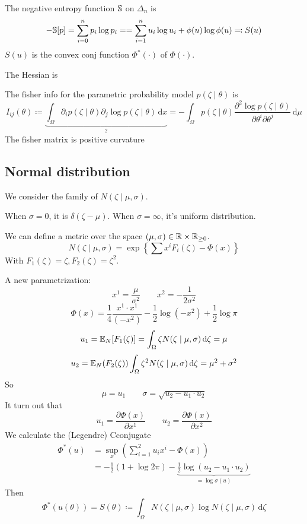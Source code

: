 \documentclass{amsart}
\let\originalmathbb\mathbb
\renewcommand{\mathbb}[1]{%
    \ifstrequal{#1}{1}{\mathbbm{#1}}{\originalmathbb{#1}}%
}
\theoremstyle{plain}
\theoremstyle{definition}
\theoremstyle{remark}
\begin{document}
The negative entropy function $\mathbb{S}$ on $\Delta _n$ is
\[
-\mathbb{S}[p]=\sum_{i=0}^{n} p_i\log p_i==\sum_{i=1}^{n} u_i\log u_i+\phi (u)\log \phi(u)\eqqcolon S(u)
\]
$S (u)$ is the convex conj function $\Phi^{*}(\cdot)$ of $\Phi(\cdot )$.

The Hessian is

The fisher info for the parametric probability model $p(\zeta \mid\theta)$  is
\[
I_{ij}(\theta)\coloneqq \underbrace{ \int_{\Omega}^{} \partial _ip(\zeta \mid \theta)\partial _j\log p(\zeta \mid \theta) \, \mathrm{d}x  }_{ ? }= -\int_{\Omega}^{} p(\zeta \mid \theta)\frac{ \partial^2 \log p(\zeta \mid \theta) }{ \partial \theta^{i}\partial \theta^{j} }  \, \mathrm{d}\mu
\]
The fisher matrix is positive curvature


\subsection{Normal distribution}

We consider the family of $N(\zeta \mid \mu,\sigma)$.

When $\sigma=0$, it is $\delta(\zeta-\mu)$. When $\sigma=\infty$, it's uniform distribution.

We can define a metric over the space $(\mu,\sigma)\in \mathbb{R}\times \mathbb{R}_{\geq0}$.
\[
N(\zeta \mid \mu,\sigma)=\exp \left\{  \sum x^{i}F_i(\zeta)-\Phi(x)  \right\}
\]
With $F_1(\zeta)=\zeta,F_2(\zeta)=\zeta^{2}$.

A new parametrization:
\[
x^{1}=\frac{\mu}{\sigma^{2}}\qquad x^{2}=-\frac{1}{2\sigma^{2}}
\]
\[
\Phi(x)=\frac{1}{4}\frac{x^{1}\cdot x^{1}}{(-x^{2})}-\frac{1}{2}\log(-x^{2})+\frac{1}{2}\log \pi
\]
\[
u_1=\mathbb{E}_{N}[F_1(\zeta)]=\int_{\Omega}^{} \zeta N(\zeta \mid \mu,\sigma) \, \mathrm{d}\zeta=\mu
\]
\[
u_2=\mathbb{E}_{N}(F_2(\zeta))\int_{\Omega}^{} \zeta^{2}N(\zeta \mid \mu,\sigma) \, \mathrm{d}\zeta=\mu^{2}+\sigma^{2}
\]
So
\[
\mu=u_1\qquad \sigma=\sqrt{ u_2-u_1\cdot u_2 }
\]
It turn out that
\[
u_1=\frac{ \partial \Phi(x) }{ \partial x^{1} } \qquad u_2=\frac{ \partial \Phi(x) }{ \partial x^{2} }
\]
We calculate the (Legendre) Cconjugate
\[
\begin{aligned}
\Phi^{*}(u) & =\sup_{x}\left( \sum_{i=1}^{2} u_ix^{i}-\Phi(x) \right) \\
 & =-\frac{1}{2}(1+\log2\pi )-\underbrace{ \frac{1}{2}\log(u_2-u_1\cdot u_2) }_{ =\log \sigma(u) } 
\end{aligned}
\]
Then
\[
\Phi^{*}(u(\theta))=S(\theta)\coloneqq \int_{\Omega}^{} N(\zeta \mid \mu,\sigma)\log N(\zeta \mid \mu,\sigma) \, \mathrm{d}\zeta
\]
\end{document}

